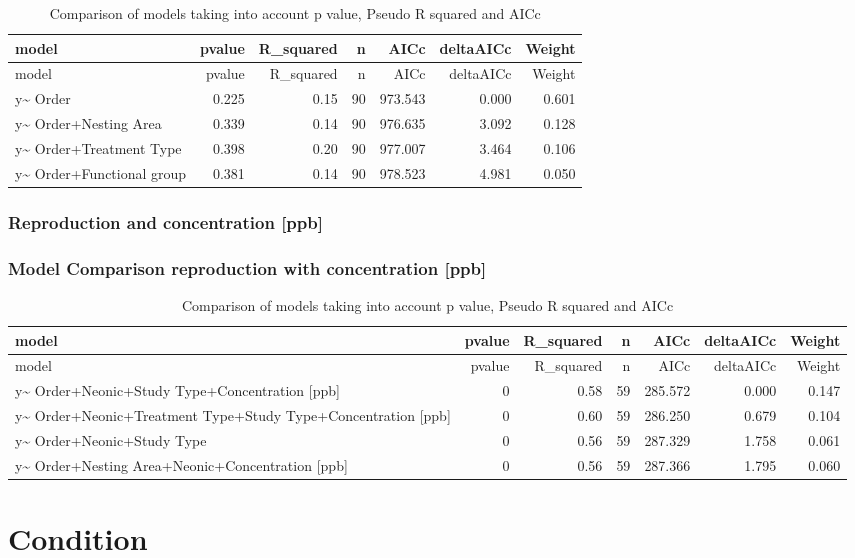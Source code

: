 \documentclass[]{elsarticle} %
\begin{document}
\begin{longtable}[c]{@{}lrrrrrr@{}}
\caption{Comparison of models taking into account p value, Pseudo R
squared and AICc}\tabularnewline
\toprule
model & pvalue & R\_squared & n & AICc & deltaAICc &
Weight\tabularnewline
\midrule
\endfirsthead
\toprule
model & pvalue & R\_squared & n & AICc & deltaAICc &
Weight\tabularnewline
\midrule
\endhead
y\textasciitilde{} Order & 0.225 & 0.15 & 90 & 973.543 & 0.000 &
0.601\tabularnewline
y\textasciitilde{} Order+Nesting Area & 0.339 & 0.14 & 90 & 976.635 &
3.092 & 0.128\tabularnewline
y\textasciitilde{} Order+Treatment Type & 0.398 & 0.20 & 90 & 977.007 &
3.464 & 0.106\tabularnewline
y\textasciitilde{} Order+Functional group & 0.381 & 0.14 & 90 & 978.523
& 4.981 & 0.050\tabularnewline
\bottomrule
\end{longtable}

\subsubsection{Reproduction and concentration
{[}ppb{]}}\label{reproduction-and-concentration-ppb}

\subsubsection{Model Comparison reproduction with concentration
{[}ppb{]}}\label{model-comparison-reproduction-with-concentration-ppb}

\begin{longtable}[c]{@{}lrrrrrr@{}}
\caption{Comparison of models taking into account p value, Pseudo R
squared and AICc}\tabularnewline
\toprule
model & pvalue & R\_squared & n & AICc & deltaAICc &
Weight\tabularnewline
\midrule
\endfirsthead
\toprule
model & pvalue & R\_squared & n & AICc & deltaAICc &
Weight\tabularnewline
\midrule
\endhead
y\textasciitilde{} Order+Neonic+Study Type+Concentration {[}ppb{]} & 0 &
0.58 & 59 & 285.572 & 0.000 & 0.147\tabularnewline
y\textasciitilde{} Order+Neonic+Treatment Type+Study Type+Concentration
{[}ppb{]} & 0 & 0.60 & 59 & 286.250 & 0.679 & 0.104\tabularnewline
y\textasciitilde{} Order+Neonic+Study Type & 0 & 0.56 & 59 & 287.329 &
1.758 & 0.061\tabularnewline
y\textasciitilde{} Order+Nesting Area+Neonic+Concentration {[}ppb{]} & 0
& 0.56 & 59 & 287.366 & 1.795 & 0.060\tabularnewline
\bottomrule
\end{longtable}

\section{Condition}\label{condition}
\end{document}
